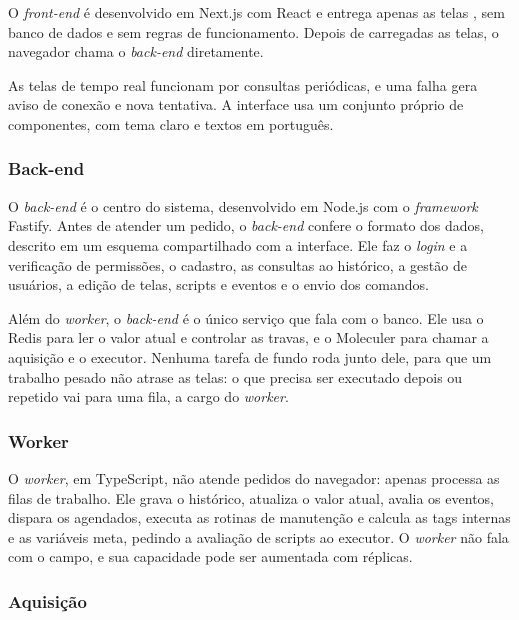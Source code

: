 \par O \emph{front-end} é desenvolvido em Next.js com React e entrega apenas as telas \cite{NEXTJS_DOCS}, sem banco de dados e sem regras de funcionamento. Depois de carregadas as telas, o navegador chama o \emph{back-end} diretamente.

\par As telas de tempo real funcionam por consultas periódicas, e uma falha gera aviso de conexão e nova tentativa. A interface usa um conjunto próprio de componentes, com tema claro e textos em português.

\subsubsection{Back-end}

\par O \emph{back-end} é o centro do sistema, desenvolvido em Node.js com o \emph{framework} Fastify. Antes de atender um pedido, o \emph{back-end} confere o formato dos dados, descrito em um esquema compartilhado com a interface. Ele faz o \emph{login} e a verificação de permissões, o cadastro, as consultas ao histórico, a gestão de usuários, a edição de telas, scripts e eventos e o envio dos comandos.

\par Além do \emph{worker}, o \emph{back-end} é o único serviço que fala com o banco. Ele usa o Redis para ler o valor atual e controlar as travas, e o Moleculer para chamar a aquisição e o executor. Nenhuma tarefa de fundo roda junto dele, para que um trabalho pesado não atrase as telas: o que precisa ser executado depois ou repetido vai para uma fila, a cargo do \emph{worker}.

\subsubsection{Worker}

\par O \emph{worker}, em TypeScript, não atende pedidos do navegador: apenas processa as filas de trabalho. Ele grava o histórico, atualiza o valor atual, avalia os eventos, dispara os agendados, executa as rotinas de manutenção e calcula as tags internas e as variáveis meta, pedindo a avaliação de scripts ao executor. O \emph{worker} não fala com o campo, e sua capacidade pode ser aumentada com réplicas.

\subsubsection{Aquisição}

